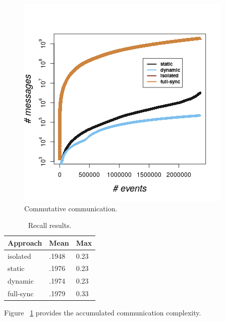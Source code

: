 \begin{figure}[]
	
	\includegraphics[width=.5\textwidth]{figures/communication.png}
	
	\caption{Commutative communication.}
	\label{fig:comm}
\end{figure}
\begin{table}[]
	\caption{Recall results.}
	\label{tab:recall}
	\begin{tabular}{lll}
		\toprule
		Approach &Mean&Max\\
		\midrule
		isolated & .1948  & 0.23 \\
		static & .1976  &  0.23 \\
		dynamic & .1974  & 0.23 \\
		full-sync & .1979  & 0.33 \\
		\bottomrule
	\end{tabular}
\end{table}



Figure ~\ref{fig:comm} provides the accumulated communication complexity.
